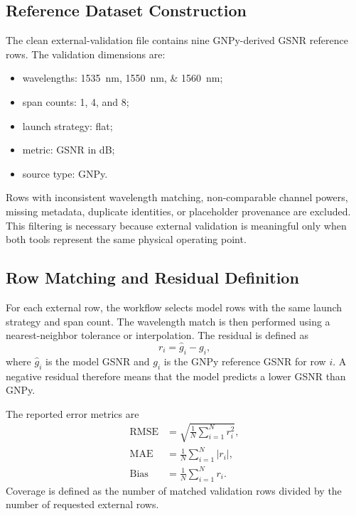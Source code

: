 \documentclass[journal]{IEEEtran}
\begin{document}
\subsection{Reference Dataset Construction}
The clean external-validation file contains nine GNPy-derived GSNR reference rows. The validation dimensions are:
\begin{itemize}
    \item wavelengths: \SIlist{1535;1550;1560}{\nano\meter};
    \item span counts: 1, 4, and 8;
    \item launch strategy: flat;
    \item metric: GSNR in dB;
    \item source type: GNPy.
\end{itemize}
Rows with inconsistent wavelength matching, non-comparable channel powers, missing metadata, duplicate identities, or placeholder provenance are excluded. This filtering is necessary because external validation is meaningful only when both tools represent the same physical operating point.

\subsection{Row Matching and Residual Definition}
For each external row, the workflow selects model rows with the same launch strategy and span count. The wavelength match is then performed using a nearest-neighbor tolerance or interpolation. The residual is defined as
\begin{equation}
 r_i = \widehat{g}_i - g_i,
\end{equation}
where $\widehat{g}_i$ is the model GSNR and $g_i$ is the GNPy reference GSNR for row $i$. A negative residual therefore means that the model predicts a lower GSNR than GNPy.

The reported error metrics are
\begin{align}
\mathrm{RMSE} &= \sqrt{\frac{1}{N}\sum_{i=1}^{N} r_i^2},\\
\mathrm{MAE} &= \frac{1}{N}\sum_{i=1}^{N}|r_i|,\\
\mathrm{Bias} &= \frac{1}{N}\sum_{i=1}^{N}r_i.
\end{align}
Coverage is defined as the number of matched validation rows divided by the number of requested external rows.
\end{document}
